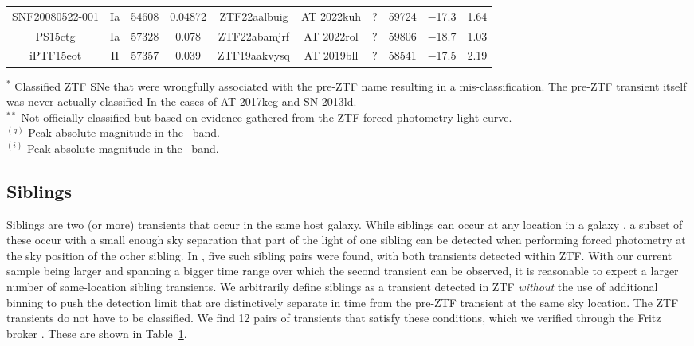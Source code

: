 \documentclass[a4paper,oneside,12pt, class=Latex/Classes/PhDthesisPSnPDF, crop=false]{standalone}
\begin{document}
\begin{table}
{\begin{tabular}{cccc|cccccc}
        SNF20080522-001 & Ia & 54608 & 0.04872 & ZTF22aalbuig & AT 2022kuh & ? & 59724 & $-$17.3 & 1.64 \\
        PS15ctg & Ia & 57328 & 0.078 & ZTF22abamjrf & AT 2022rol & ? & 59806 & $-$18.7 & 1.03 \\
        
        iPTF15eot & II & 57357 & 0.039 & ZTF19aakvysq & AT 2019bll & ? & 58541 & $-$17.5 & 2.19 \\
        \hline %
    \end{tabular}
    }
    \begin{flushleft}
        $^*$ Classified ZTF SNe that were wrongfully associated with the pre-ZTF name resulting in a mis-classification. The pre-ZTF transient itself was never actually classified In the cases of AT 2017keg and SN 2013ld.\\
        $^{**}$ Not officially classified but based on evidence gathered from the ZTF forced photometry light curve.\\
        $^{(g)}$ Peak absolute magnitude in the \ztfg\ band.\\
        $^{(i)}$ Peak absolute magnitude in the \ztfi\ band.\\
    \end{flushleft}
    \label{sibling_table}
\end{table}


\subsection{Siblings}
\label{siblings}
Siblings are two (or more) transients that occur in the same host galaxy. While siblings can occur at any location in a galaxy \citep[see e.g. ][for a sample of ZTF-detected siblings]{BTS_siblings, DR2_siblings}, a subset of these occur with a small enough sky separation that part of the light of one sibling can be detected when performing forced photometry at the sky position of the other sibling. In \citet{Terwel_2024_paper1}, five such sibling pairs were found, with both transients detected within ZTF. With our current sample being larger and spanning a bigger time range over which the second transient can be observed, it is reasonable to expect a larger number of same-location sibling transients. We arbitrarily define siblings as a transient detected in ZTF \textit{without} the use of additional binning to push the detection limit that are distinctively separate in time from the pre-ZTF transient at the same sky location. The ZTF transients do not have to be classified. We find 12 pairs of transients that satisfy these conditions, which we verified through the Fritz broker \cite{skyportal2019, Skyportal}. These are shown in Table~\ref{sibling_table}. 
\end{document}
